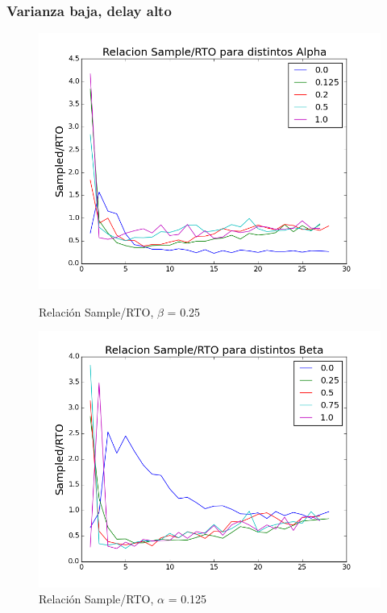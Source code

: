 \subsubsection{Varianza baja, delay alto}

\begin{figure}[H]
\begin{minipage}{0.5\linewidth}
\includegraphics[width=\linewidth]{../graficos/alphad025var2drop0.png}
\caption{Relación Sample/RTO, $\beta$ = 0.25}\label{fig:alpha-var2-drop0-alto}
\end{minipage}
\hfill
\begin{minipage}{0.5\linewidth}
\includegraphics[width=\linewidth]{../graficos/betad025var2drop0.png}
\caption{Relación Sample/RTO, $\alpha$ = 0.125}\label{fig:beta-var2-drop0-alto}
\end{minipage}
\end{figure}

